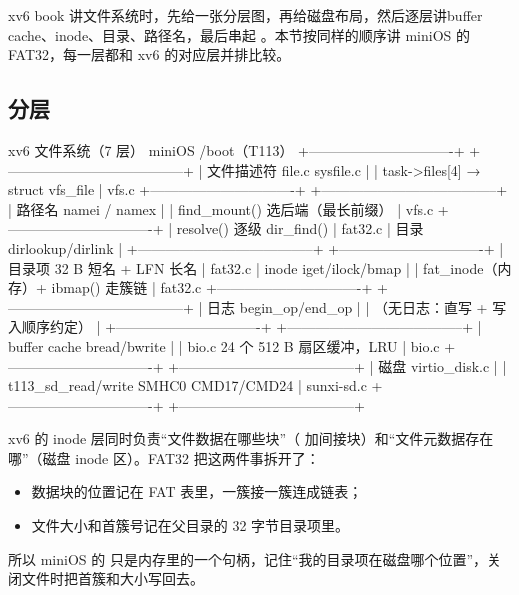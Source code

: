 xv6 book 讲文件系统时，先给一张分层图，再给磁盘布局，然后逐层讲buffer cache、inode、目录、路径名，最后串起 。本节按同样的顺序讲 miniOS 的 FAT32，每一层都和 xv6 的对应层并排比较。

\subsection{分层}

\begin{txtcode}
        xv6 文件系统（7 层）                     miniOS /boot（T113）
 +-------------------------------+      +--------------------------------------+
 | 文件描述符  file.c sysfile.c  |      | task->files[4] → struct vfs_file     | vfs.c
 +-------------------------------+      +--------------------------------------+
 | 路径名      namei / namex     |      | find_mount() 选后端（最长前缀）       | vfs.c
 +-------------------------------+      | resolve() 逐级 dir_find()            | fat32.c
 | 目录        dirlookup/dirlink |      +--------------------------------------+
 +-------------------------------+      | 目录项 32 B 短名 + LFN 长名           | fat32.c
 | inode       iget/ilock/bmap   |      | fat_inode（内存）+ ibmap() 走簇链     | fat32.c
 +-------------------------------+      +--------------------------------------+
 | 日志        begin_op/end_op   |      | （无日志：直写 + 写入顺序约定）        |
 +-------------------------------+      +--------------------------------------+
 | buffer cache  bread/bwrite    |      | bio.c  24 个 512 B 扇区缓冲，LRU      | bio.c
 +-------------------------------+      +--------------------------------------+
 | 磁盘        virtio_disk.c     |      | t113_sd_read/write  SMHC0 CMD17/CMD24 | sunxi-sd.c
 +-------------------------------+      +--------------------------------------+
\end{txtcode}

xv6 的 inode 层同时负责“文件数据在哪些块”（ 加间接块）和“文件元数据存在哪”（磁盘 inode 区）。FAT32 把这两件事拆开了：

\begin{itemize}
  \item 数据块的位置记在 FAT 表里，一簇接一簇连成链表；
  \item 文件大小和首簇号记在父目录的 32 字节目录项里。
\end{itemize}

所以 miniOS 的  只是内存里的一个句柄，记住“我的目录项在磁盘哪个位置”，关闭文件时把首簇和大小写回去。

